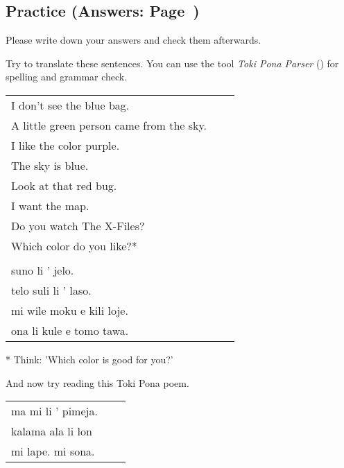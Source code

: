 \subsection*{Practice (Answers: Page~\pageref{'colors'})}
%
Please write down your answers and check them afterwards. 

Try to translate these sentences. 
You can use the tool \textit{Toki Pona Parser} (\cite{www:rowa:02}) for spelling and grammar check. 

\begin{supertabular}{p{5,5cm}|ll}
I don't see the blue bag. &&   \\ %
A little green person came from the sky. &&   \\ %
I like the color purple.  &&  \\ %
The sky is blue. &&   \\ %
Look at that red bug.  &&  \\ %
I want the map.  &&  \\ %
Do you watch The X-Files? &&  \\  %
Which color do you like?* &&  \\  %
 && \\ %
suno li ' jelo. &&   \\ %
telo suli li ' laso.  &&  \\ %
mi wile moku e kili loje.  &&  \\ %
ona li kule e tomo tawa. &&   \\ %
\end{supertabular} 

* Think: 'Which color is good for you?' 

And now try reading this Toki Pona poem. 

\begin{supertabular}{p{5,5cm}|ll}
ma mi li ' pimeja. && \\ %
kalama ala li lon && \\ %
mi lape. mi sona. && \\ %
\end{supertabular} 
